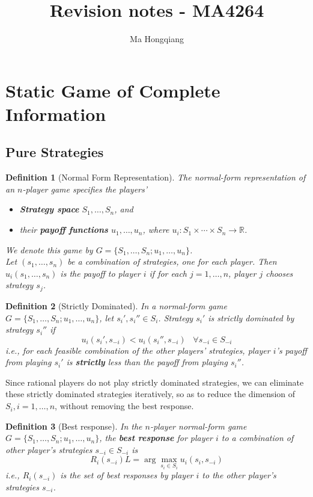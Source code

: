 \documentclass[12pt]{article}
\newtheorem{definition}{Definition}[section]
\theoremstyle{definition}
\begin{document}
\title{Revision notes - MA4264}
\author{Ma Hongqiang}
\maketitle
\tableofcontents

\twocolumn
\section{Static Game of Complete Information}
\subsection{Pure Strategies}
\begin{definition}[Normal Form Representation]
\normalfont
The normal-form representation of an $n$-player game specifies the players'
\begin{itemize}
  \item \textbf{Strategy space} $S_1,\ldots, S_n$, and 
  \item their \textbf{payoff functions} $u_1, \ldots, u_n$, where $u_i: S_1\times \cdots\times S_n \to \mathbb{R}$.
\end{itemize}
We denote this game by $G=\{S_1,\ldots, S_n; u_1,\ldots, u_n\}$.\\
Let $(s_1,\ldots, s_n)$ be a combination of strategies, one for each player. Then $u_i(s_1,\ldots, s_n)$ is the payoff to player $i$ if for each $j=1,\ldots, n$, player $j$ chooses strategy $s_j$.
\end{definition}
\begin{definition}[Strictly Dominated]
\normalfont In a normal-form game $G=\{S_1,\ldots, S_n; u_1,\ldots, u_n\}$, let $s_i', s_i''\in S_i$. Strategy $s_i'$ is strictly dominated by strategy $s_i''$ if 
\[
u_i(s_i', s_{-i})<u_i(s_i'', s_{-i})\;\;\;\forall s_{-i}\in S_{-i}
\]
i.e., for each feasible combination of the other players' strategies, player $i$'s payoff from playing $s_i'$ is \textbf{strictly} less than the payoff from playing $s_i''$.
\end{definition}
Since rational players do not play strictly dominated strategies, we can eliminate these strictly dominated strategies iteratively, so as to reduce the dimension of $S_i, i=1,\ldots, n$, without removing the best response.
\begin{definition}[Best response]
\normalfont In the $n$-player normal-form game $G=\{S_1,\ldots, S_n; u_1,\ldots, u_n\}$, the \textbf{best response} for player $i$ to a combination of other player's strategies $s_{-i}\in S_{-i}$ is
\[
R_i(s_{-i})L=\arg\max_{s_i\in S_i}u_i(s_i, s_{-i})
\]
i.e., $R_i(s_{-i})$ is the \textit{set of best responses} by player $i$ to the other player's strategies $s_{-i}$.
\end{definition}
\end{document}
